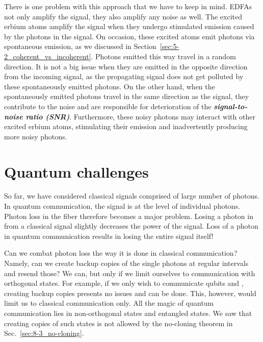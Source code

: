 There is one problem with this approach that we have to keep in mind.
EDFAs not only amplify the signal, they also amplify any noise as well.
The excited erbium atoms amplify the signal when they undergo stimulated emission caused by the photons in the signal.
On occasion, these excited atoms emit photons via spontaneous emission, as we discussed in Section~\ref{sec:5-2_coherent_vs_incoherent}.
Photons emitted this way travel in a random direction.
It is not a big issue when they are emitted in the opposite direction from the incoming signal, as the propagating signal does not get polluted by these spontaneously emitted photons.
On the other hand, when the spontaneously emitted photons travel in the same direction as the signal, they contribute to the noise and are responsible for deterioration of the \textbf{\emph{signal-to-noise ratio (SNR)}}.
Furthermore, these noisy photons may interact with other excited erbium atoms, stimulating their emission and inadvertently producing more noisy photons.


\section{Quantum challenges}
\label{sec:quantum_challenges}

So far, we have considered classical signals comprised of large number of photons.
In quantum communication, the signal is at the level of individual photons.
Photon loss in the fiber therefore becomes a major problem.
Losing a photon in from a classical signal slightly decreases the power of the signal.
Loss of a photon in quantum communication results in losing the entire signal itself!

Can we combat photon loss the way it is done in classical communication?
Namely, can we create backup copies of the single photons at regular intervals and resend those?
We can, but only if we limit ourselves to communication with orthogonal states.
For example, if we only wish to communicate qubits  and , creating backup copies presents no issues and can be done.
This, however, would limit us to classical communication only.
All the magic of quantum communication lies in non-orthogonal states and entangled states.
We saw that creating copies of such states is not allowed by the no-cloning theorem in Sec.~\ref{sec:8-3_no-cloning}.

